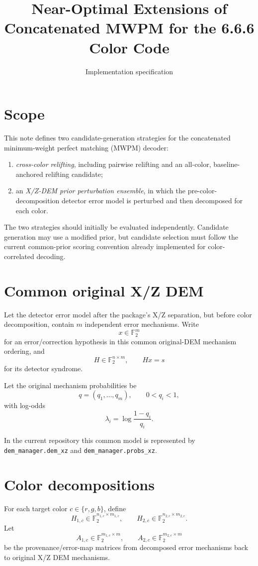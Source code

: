 \documentclass[11pt]{article}
\title{Near-Optimal Extensions of Concatenated MWPM for the 6.6.6 Color Code}
\author{Implementation specification}
\date{}
\newcommand{\F}{\mathbb{F}_2}
\newcommand{\rgb}{\{r,g,b\}}
\begin{document}
\maketitle

\section{Scope}

This note defines two candidate-generation strategies for the concatenated
minimum-weight perfect matching (MWPM) decoder:
\begin{enumerate}
    \item \emph{cross-color relifting}, including pairwise relifting and an
    all-color, baseline-anchored relifting candidate;
    \item an \emph{X/Z-DEM prior perturbation ensemble}, in which the
    pre-color-decomposition detector error model is perturbed and then
    decomposed for each color.
\end{enumerate}

The two strategies should initially be evaluated independently. Candidate
generation may use a modified prior, but candidate selection must follow the
current common-prior scoring convention already implemented for
color-correlated decoding.

\section{Common original X/Z DEM}

Let the detector error model after the package's X/Z separation, but before
color decomposition, contain $m$ independent error mechanisms. Write
\[
    x\in\F^m
\]
for an error/correction hypothesis in this common original-DEM mechanism
ordering, and
\[
    H\in\F^{n\times m},\qquad Hx=s
\]
for its detector syndrome.

Let the original mechanism probabilities be
\[
    q=(q_1,\ldots,q_m),\qquad 0<q_i<1,
\]
with log-odds
\[
    \lambda_i=\log\frac{1-q_i}{q_i}.
    \tag{1}
\]

In the current repository this common model is represented by
\texttt{dem\_manager.dem\_xz} and \texttt{dem\_manager.probs\_xz}.

\section{Color decompositions}

For each target color $c\in\rgb$, define
\[
    H_{1,c}\in\F^{n_{1,c}\times m_{1,c}},\qquad
    H_{2,c}\in\F^{n_{2,c}\times m_{2,c}}.
\]
Let
\[
    A_{1,c}\in\F^{m_{1,c}\times m},\qquad
    A_{2,c}\in\F^{m_{2,c}\times m}
\]
be the provenance/error-map matrices from decomposed error mechanisms back to
original X/Z DEM mechanisms.
\end{document}

